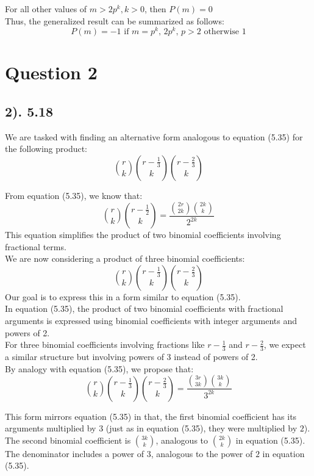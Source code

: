 \documentclass[12pt]{article}
\begin{document}
For all other values of \( m > 2p^k, k>0\), then \( P(m)=0 \)\\
  
Thus, the generalized result can be summarized as follows:
\[
P(m) = -1 \text{ if } m = p^k,\, 2p^k,\, p > 2 \text{ otherwise } 1
\]

\section*{Question 2}
\subsection*{2). 5.18}
We are tasked with finding an alternative form analogous to equation (5.35) for the following product:
\[
\binom{r}{k} \binom{r - \frac{1}{3}}{k} \binom{r - \frac{2}{3}}{k}
\]

From equation (5.35), we know that:
\[
\binom{r}{k} \binom{r - \frac{1}{2}}{k} = \frac{\binom{2r}{2k} \binom{2k}{k}} { 2^{2k} }
\]
This equation simplifies the product of two binomial coefficients involving fractional terms.\\

We are now considering a product of three binomial coefficients:
\[
\binom { r } { k } \binom { r - \frac { 1 } { 3 } } { k } \binom { r - \frac { 2 } { 3 } } { k }
\]
Our goal is to express this in a form similar to equation (5.35).\\

In equation (5.35), the product of two binomial coefficients with fractional arguments is expressed using binomial coefficients with integer arguments and powers of 2.\\

For three binomial coefficients involving fractions like \( r - \frac { 1 } { 3 } \) and \( r - \frac { 2 } { 3 }\), we expect a similar structure but involving powers of 3 instead of powers of 2.\\

By analogy with equation (5.35), we propose that:
\[
\binom { r } { k } \binom { r - \frac { 1 } { 3 } } { k } \binom { r - \frac { 2 } { 3 } } { k }
= 
\frac{\binom { 3r } { 3k } \binom { 3k } { k }} {  3 ^ { 2 k }}
\]

This form mirrors equation (5.35) in that, the first binomial coefficient has its arguments multiplied by \(3\) (just as in equation (5.35), they were multiplied by \(2\)). The second binomial coefficient is \( \binom{3k}{k} \), analogous to \( \binom{2k}{k} \) in equation (5.35). The denominator includes a power of \(3\), analogous to the power of \(2\) in equation (5.35).\\
\end{document}
